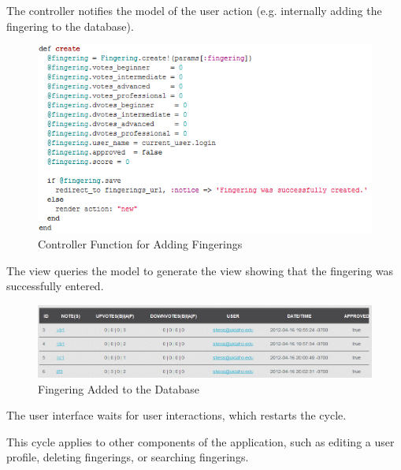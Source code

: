 \documentclass[12pt,english]{article}
\begin{document}
The controller notifies the model of the user action (e.g. internally
adding the fingering to the database).

\begin{figure}[H]
\caption{Controller Function for Adding Fingerings}


\begin{centering}
\includegraphics[scale=0.7]{controller_add}
\par\end{centering}

\end{figure}


The view queries the model to generate the view showing that the fingering
was successfully entered.

\begin{figure}[H]
\caption{Fingering Added to the Database}


\noindent \centering{}\includegraphics[scale=0.45]{database_add}
\end{figure}


The user interface waits for user interactions, which restarts the
cycle.

\medskip{}


This cycle applies to other components of the application, such as
editing a user profile, deleting fingerings, or searching fingerings. 
\end{document}
